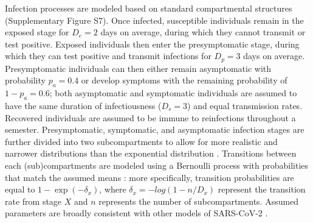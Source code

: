 \documentclass[12pt]{article}
\begin{document}
Infection processes are modeled based on standard compartmental structures (Supplementary Figure S7).
Once infected, susceptible individuals remain in the exposed stage for $D_e = 2$ days on average, during which they cannot transmit or test positive. 
Exposed individuals then enter the presymptomatic stage, during which they can test positive and transmit infections for $D_p = 3$ days on average.
Presymptomatic individuals can then either remain asymptomatic with probability $p_a = 0.4$ or develop symptoms with the remaining probability of $1-p_a = 0.6$; both asymptomatic and symptomatic individuals are assumed to have the same duration of infectiousness ($D_s=3$) and equal transmission rates.
Recovered individuals are assumed to be immune to reinfections throughout a semester.
Presymptomatic, symptomatic, and asymptomatic infection stages are further divided into two subcompartments to allow for more realistic and narrower distributions than the exponential distribution \citep{brett2020transmission}.
Transitions between each (sub)compartments are modeled using a Bernoulli process with probabilities that match the assumed means \citep{he2010plug}:
more specifically, transition probabilities are equal to $1 - \exp(-\delta_x)$, where $\delta_x = -log(1-n/D_x)$ represent the transition rate from stage $X$ and $n$ represents the number of subcompartments.
Assumed parameters are broadly consistent with other models of SARS-CoV-2 \citep{brett2020transmission,lavezzo2020suppression}.
\end{document}

